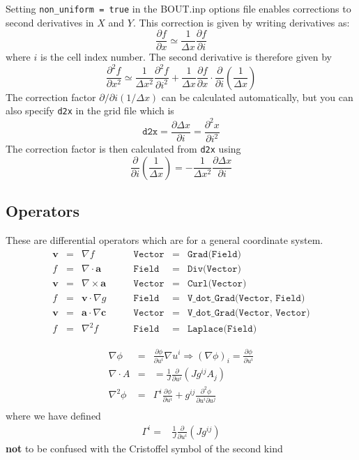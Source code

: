 \documentclass[12pt]{article}
\newcommand{\code}[1]{\texttt{#1}}
\newcommand{\deriv}[2]{\ensuremath{\frac{\partial #1}{\partial #2}}}
\begin{document}
Setting \texttt{non\_uniform = true} in the BOUT.inp options file
enables corrections to second derivatives in $X$ and $Y$. This correction
is given by writing derivatives as:
\[
\deriv{f}{x} \simeq \frac{1}{\Delta x} \deriv{f}{i}
\]
where $i$ is the cell index number. The second derivative is therefore given by
\[
\frac{\partial^2 f}{\partial x^2} \simeq \frac{1}{\Delta x^2}\frac{\partial^2 f}{\partial i^2} + \frac{1}{\Delta x}\deriv{f}{x} \cdot \deriv{}{i}\left(\frac{1}{\Delta x}\right)
\]
The correction factor $\partial/\partial i\left(1/\Delta x\right)$ can be
calculated automatically, but you can also specify \texttt{d2x} in the grid file which is
\[
\texttt{d2x} = \deriv{\Delta x}{i} = \frac{\partial^2 x}{\partial i^2}
\]
The correction factor is then calculated from \texttt{d2x} using
\[
\deriv{}{i}\left(\frac{1}{\Delta x}\right) = -\frac{1}{\Delta x^2} \deriv{\Delta x}{i}
\]


\subsection{Operators}

These are differential operators which are for a general coordinate system.
\[
\begin{array}{rclrcl}
\mathbf{v} &=& \nabla f &\qquad \code{Vector} &=& \code{Grad(Field)} \\
f &=& \nabla\cdot\mathbf{a} &\qquad \code{Field} &=& \code{Div(Vector)} \\
\mathbf{v} &=& \nabla\times\mathbf{a} &\qquad \code{Vector} &=& \code{Curl(Vector)} \\
f &=& \mathbf{v}\cdot\nabla g &\qquad \code{Field} &=& \code{V\_dot\_Grad(Vector, Field)} \\
\mathbf{v} &=& \mathbf{a}\cdot\nabla\mathbf{c} &\qquad \code{Vector} &=& 
\code{V\_dot\_Grad(Vector, Vector)} \\
f &=& \nabla^2 f &\qquad \code{Field} &=& \code{Laplace(Field)}
\end{array}
\]

\begin{eqnarray*}
\nabla\phi &=& \deriv{\phi}{u^i}\nabla u^i \Rightarrow \left(\nabla\phi\right)_i = \deriv{\phi}{u^i} \\
\nabla\cdot A &=& = \frac{1}{J}\deriv{}{u^i}\left(Jg^{ij}A_j\right) \\
\nabla^2\phi &=& \Gamma^i\deriv{\phi}{u^i} + g^{ij}\frac{\partial^2\phi}{\partial u^i\partial u^j} \\
\end{eqnarray*}
%
where we have defined
%
\begin{align*}
\Gamma^i =& \frac{1}{J}\deriv{}{u^i}\left(Jg^{ij}\right)
\end{align*}
%
\textbf{not} to be confused with the Cristoffel symbol of the second kind
\end{document}
